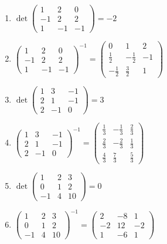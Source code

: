\documentclass[11pt,a4paper]{article}
\begin{document}
\begin{enumerate}
\item $\displaystyle \det \begin{pmatrix} 1 & 2 & 0 \\ -1 & 2 & 2 \\ 1 & -1 & -1 \end{pmatrix} = -2$
\item $\displaystyle \begin{pmatrix} 1 & 2 & 0 \\ -1 & 2 & 2 \\ 1 & -1 & -1 \end{pmatrix}^{-1} = \begin{pmatrix} 0 & 1 & 2 \\ \frac{1}{2} & -\frac{1}{2} & -1 \\ -\frac{1}{2} & \frac{3}{2} & 1 \end{pmatrix}$
\item $\displaystyle \det \begin{pmatrix} 1 & 3 & -1 \\ 2 & 1 & -1 \\ 2 & -1 & 0 \end{pmatrix} = 3$
\item $\displaystyle \begin{pmatrix} 1 & 3 & -1 \\ 2 & 1 & -1 \\ 2 & -1 & 0 \end{pmatrix}^{-1} = \begin{pmatrix} \frac{1}{3} & -\frac{1}{3} & \frac{2}{3} \\ \frac{2}{3} & -\frac{2}{3} & \frac{1}{3} \\ \frac{4}{3} & \frac{7}{3} & \frac{5}{3} \end{pmatrix}$
\item $\displaystyle \det \begin{pmatrix} 1 & 2 & 3 \\ 0 & 1 & 2 \\ -1 & 4 & 10 \end{pmatrix} = 0$
\item $\displaystyle \begin{pmatrix} 1 & 2 & 3 \\ 0 & 1 & 2 \\ -1 & 4 & 10 \end{pmatrix}^{-1} = \begin{pmatrix} 2 & -8 & 1 \\ -2 & 12 & -2 \\ 1 & -6 & 1 \end{pmatrix}$

\end{enumerate}
\end{document}
